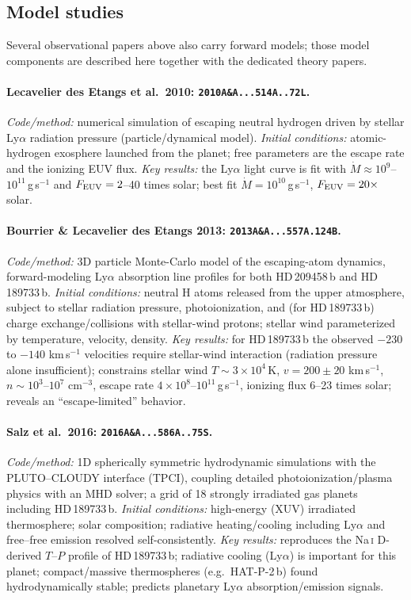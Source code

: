\subsection{Model studies}

Several observational papers above also carry forward models; those model
components are described here together with the dedicated theory papers.

\paragraph{Lecavelier des Etangs et al.\ 2010: \texttt{2010A\&A...514A..72L}.}
\emph{Code/method:} numerical simulation of escaping neutral hydrogen driven by
stellar Ly$\alpha$ radiation pressure (particle/dynamical model).
\emph{Initial conditions:} atomic-hydrogen exosphere launched from the planet;
free parameters are the escape rate and the ionizing EUV flux.
\emph{Key results:} the Ly$\alpha$ light curve is fit with
$\dot{M}\approx10^{9}$--$10^{11}$\,g\,s$^{-1}$ and $F_{\rm EUV}=2$--40 times
solar; best fit $\dot{M}=10^{10}$\,g\,s$^{-1}$, $F_{\rm EUV}=20\times$ solar.

\paragraph{Bourrier \& Lecavelier des Etangs 2013: \texttt{2013A\&A...557A.124B}.}
\emph{Code/method:} 3D particle Monte-Carlo model of the escaping-atom
dynamics, forward-modeling Ly$\alpha$ absorption line profiles for both
HD\,209458\,b and HD\,189733\,b.
\emph{Initial conditions:} neutral H atoms released from the upper atmosphere,
subject to stellar radiation pressure, photoionization, and (for
HD\,189733\,b) charge exchange/collisions with stellar-wind protons; stellar
wind parameterized by temperature, velocity, density.
\emph{Key results:} for HD\,189733\,b the observed $-230$ to $-140$ km\,s$^{-1}$
velocities require stellar-wind interaction (radiation pressure alone
insufficient); constrains stellar wind $T\sim3\times10^{4}$\,K,
$v=200\pm20$ km\,s$^{-1}$, $n\sim10^{3}$--$10^{7}$ cm$^{-3}$, escape rate
$4\times10^{8}$--$10^{11}$\,g\,s$^{-1}$, ionizing flux 6--23 times solar;
reveals an ``escape-limited'' behavior.

\paragraph{Salz et al.\ 2016: \texttt{2016A\&A...586A..75S}.}
\emph{Code/method:} 1D spherically symmetric hydrodynamic simulations with the
PLUTO--CLOUDY interface (TPCI), coupling detailed photoionization/plasma
physics with an MHD solver; a grid of 18 strongly irradiated gas planets
including HD\,189733\,b.
\emph{Initial conditions:} high-energy (XUV) irradiated thermosphere; solar
composition; radiative heating/cooling including Ly$\alpha$ and free--free
emission resolved self-consistently.
\emph{Key results:} reproduces the Na\,\textsc{i} D-derived $T$--$P$ profile of
HD\,189733\,b; radiative cooling (Ly$\alpha$) is important for this planet;
compact/massive thermospheres (e.g.\ HAT-P-2\,b) found hydrodynamically stable;
predicts planetary Ly$\alpha$ absorption/emission signals.

